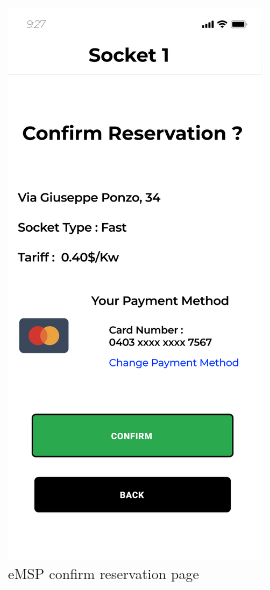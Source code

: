 \documentclass{Configuration_Files/PoliMi3i_thesis}
\begin{document}
\begin{figure}[H]
    \centering
    \includegraphics[width=0.6\textwidth]{Images/user-interface/emsp/eMSP (1)-08.png}
    \caption{eMSP confirm reservation page}
\end{figure}
\end{document}

